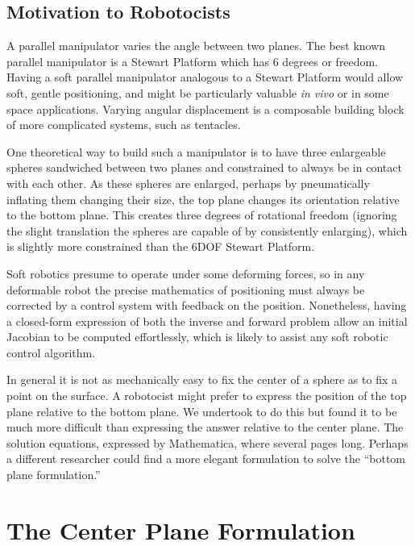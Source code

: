 \documentclass{article}
\begin{document}
\subsection{Motivation to Robotocists}

A parallel manipulator varies the angle between two planes.
The best known parallel manipulator is
a Stewart Platform\cite{wiki:stewart} which has 6 degrees or freedom.
Having a soft parallel manipulator analogous to a Stewart Platform would allow soft,
gentle positioning,
and might be particularly valuable {\it in vivo}\cite{white2018soft} or in some space applications\cite{glassner2020soft}.
Varying angular displacement is a composable building block of more complicated systems, such as tentacles.

One theoretical way to build such a manipulator is to have three enlargeable spheres sandwiched between two planes
and constrained to always be in contact with each other.
As these spheres are enlarged, perhaps by pneumatically inflating them changing
their size, the top plane changes its orientation relative to the bottom plane.
This creates three degrees of rotational freedom
(ignoring the slight translation the spheres are capable of by consistently enlarging),
which is slightly more constrained than the 6DOF Stewart Platform.

Soft robotics presume to operate under some deforming forces, so in any deformable robot the precise mathematics
of positioning must always be corrected by a control system with feedback on the position.
Nonetheless, having a closed-form expression of both the inverse and forward problem allow
an initial Jacobian to be computed effortlessly, which is likely to assist any soft robotic control algorithm.

In general it is not as mechanically easy to fix the center of a sphere as to fix a point on the surface.
A robotocist might prefer to express the position of the top plane relative to the bottom plane.
We undertook to do this but found it to be much more difficult than expressing the answer relative
to the center plane. The solution equations, expressed by Mathematica, where several pages long.
Perhaps a different researcher could find a more elegant formulation to solve the ``bottom plane formulation.''

\section{The Center Plane Formulation}
\end{document}
